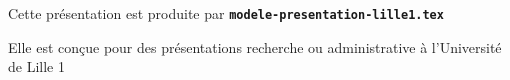   \item Cette présentation est produite par \texttt{\textbf{modele-presentation-lille1.tex}}
  \item Elle est conçue pour des présentations recherche ou administrative à l'Université de Lille 1
